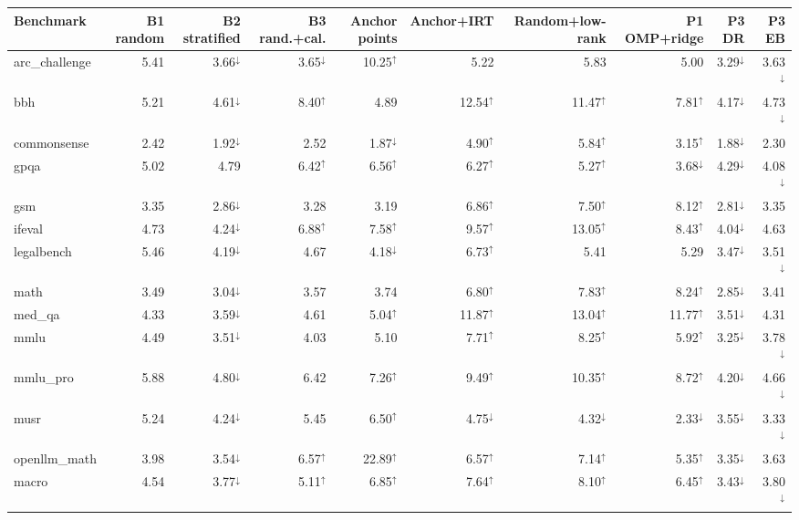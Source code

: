 {\scriptsize\setlength{\tabcolsep}{2.5pt}
\begin{tabular}{lrrrrrrrrr}
\toprule
Benchmark & B1 random & B2 stratified & B3 rand.+cal. & Anchor points & Anchor+IRT & Random+low-rank & P1 OMP+ridge & P3 DR & P3 EB \\
\midrule
arc\_challenge & 5.41 & 3.66$^{\downarrow}$ & 3.65$^{\downarrow}$ & 10.25$^{\uparrow}$ & 5.22 & 5.83 & 5.00 & 3.29$^{\downarrow}$ & 3.63$^{\downarrow}$ \\
bbh & 5.21 & 4.61$^{\downarrow}$ & 8.40$^{\uparrow}$ & 4.89 & 12.54$^{\uparrow}$ & 11.47$^{\uparrow}$ & 7.81$^{\uparrow}$ & 4.17$^{\downarrow}$ & 4.73$^{\downarrow}$ \\
commonsense & 2.42 & 1.92$^{\downarrow}$ & 2.52 & 1.87$^{\downarrow}$ & 4.90$^{\uparrow}$ & 5.84$^{\uparrow}$ & 3.15$^{\uparrow}$ & 1.88$^{\downarrow}$ & 2.30 \\
gpqa & 5.02 & 4.79 & 6.42$^{\uparrow}$ & 6.56$^{\uparrow}$ & 6.27$^{\uparrow}$ & 5.27$^{\uparrow}$ & 3.68$^{\downarrow}$ & 4.29$^{\downarrow}$ & 4.08$^{\downarrow}$ \\
gsm & 3.35 & 2.86$^{\downarrow}$ & 3.28 & 3.19 & 6.86$^{\uparrow}$ & 7.50$^{\uparrow}$ & 8.12$^{\uparrow}$ & 2.81$^{\downarrow}$ & 3.35 \\
ifeval & 4.73 & 4.24$^{\downarrow}$ & 6.88$^{\uparrow}$ & 7.58$^{\uparrow}$ & 9.57$^{\uparrow}$ & 13.05$^{\uparrow}$ & 8.43$^{\uparrow}$ & 4.04$^{\downarrow}$ & 4.63 \\
legalbench & 5.46 & 4.19$^{\downarrow}$ & 4.67 & 4.18$^{\downarrow}$ & 6.73$^{\uparrow}$ & 5.41 & 5.29 & 3.47$^{\downarrow}$ & 3.51$^{\downarrow}$ \\
math & 3.49 & 3.04$^{\downarrow}$ & 3.57 & 3.74 & 6.80$^{\uparrow}$ & 7.83$^{\uparrow}$ & 8.24$^{\uparrow}$ & 2.85$^{\downarrow}$ & 3.41 \\
med\_qa & 4.33 & 3.59$^{\downarrow}$ & 4.61 & 5.04$^{\uparrow}$ & 11.87$^{\uparrow}$ & 13.04$^{\uparrow}$ & 11.77$^{\uparrow}$ & 3.51$^{\downarrow}$ & 4.31 \\
mmlu & 4.49 & 3.51$^{\downarrow}$ & 4.03 & 5.10 & 7.71$^{\uparrow}$ & 8.25$^{\uparrow}$ & 5.92$^{\uparrow}$ & 3.25$^{\downarrow}$ & 3.78$^{\downarrow}$ \\
mmlu\_pro & 5.88 & 4.80$^{\downarrow}$ & 6.42 & 7.26$^{\uparrow}$ & 9.49$^{\uparrow}$ & 10.35$^{\uparrow}$ & 8.72$^{\uparrow}$ & 4.20$^{\downarrow}$ & 4.66$^{\downarrow}$ \\
musr & 5.24 & 4.24$^{\downarrow}$ & 5.45 & 6.50$^{\uparrow}$ & 4.75$^{\downarrow}$ & 4.32$^{\downarrow}$ & 2.33$^{\downarrow}$ & 3.55$^{\downarrow}$ & 3.33$^{\downarrow}$ \\
openllm\_math & 3.98 & 3.54$^{\downarrow}$ & 6.57$^{\uparrow}$ & 22.89$^{\uparrow}$ & 6.57$^{\uparrow}$ & 7.14$^{\uparrow}$ & 5.35$^{\uparrow}$ & 3.35$^{\downarrow}$ & 3.63 \\
\midrule
macro & 4.54 & 3.77$^{\downarrow}$ & 5.11$^{\uparrow}$ & 6.85$^{\uparrow}$ & 7.64$^{\uparrow}$ & 8.10$^{\uparrow}$ & 6.45$^{\uparrow}$ & 3.43$^{\downarrow}$ & 3.80$^{\downarrow}$ \\
\bottomrule
\end{tabular}}
